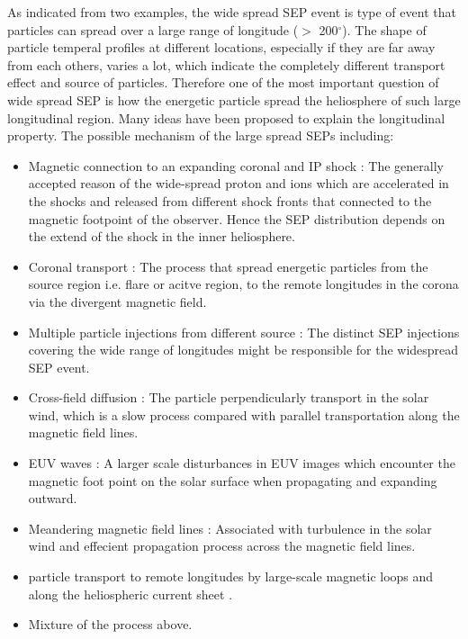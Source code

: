 As indicated from two examples, the wide spread \ac{SEP} event is type of event that particles can spread over a large range of longitude ($>$ 200$^\circ$). The shape of particle temperal profiles at different locations, especially if they are far away from each others, varies a lot, which indicate the completely different transport effect and source of particles. 
Therefore one of the most important question of wide spread \ac{SEP} is how the energetic particle spread the heliosphere of such large longitudinal region. Many ideas have been proposed to explain the longitudinal property. The possible mechanism of the large spread SEPs including:
\begin{itemize}
	\item Magnetic connection to an expanding coronal and IP shock \citep{Cliver1995ICRC, Torsti1999JGR, Reames1999, cane2003two, Richardson2014SoPh, Kouloumvakos2019ApJ}: The generally accepted reason of the wide-spread proton and ions which are accelerated in the shocks and released from different shock fronts that connected to the magnetic footpoint of the observer. Hence the SEP distribution depends on the extend of the shock in the inner heliosphere.

	\item Coronal transport \cite{Reinhard1974SoPh, Newkirk1978JGR}: The process that spread energetic particles from the source region i.e. flare or acitve region, to the remote longitudes in the corona via the divergent magnetic field. 
	\item Multiple particle injections from different source \citep{dresing202317}: The distinct \ac{SEP} injections covering the wide range of longitudes might be responsible for the widespread SEP event.
	\item Cross-field diffusion \citep{Dresing2012SoPh}: The particle perpendicularly transport in the solar wind, which is a slow process compared with parallel transportation along the magnetic field lines. 
	\item EUV waves \citet{Rouillard2012ApJ, Park2013ApJ}: A larger scale disturbances in EUV images which encounter the magnetic foot point on the solar surface when propagating and expanding outward.
	\item Meandering magnetic field lines \citet{Laitinen2016AA, Laitinen2023ApJL}: Associated with turbulence in the solar wind and effecient propagation process across the magnetic field lines.
	\item particle transport to remote longitudes by large-scale magnetic loops \cite{Klassen2018AA, Schrijver2013ApJ} and along the heliospheric current sheet \cite{Battarbee2018ApJ}.
	\item Mixture of the process above.
\end{itemize}

